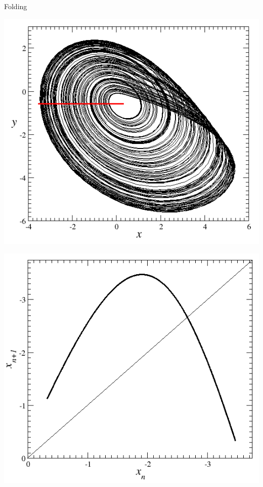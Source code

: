 \documentclass[usenames, dvipsnames, aspectratio=169]{beamer}
\begin{document}
\begin{frame}[t, c]{Folding}{}
  \vfill
  
  \begin{minipage}{.48\textwidth}
    \centering
    \includegraphics[width=\textwidth]{folding}
  \end{minipage}%
  \hfill
  \begin{minipage}{.48\textwidth}
    \centering
    \includegraphics[width=\textwidth]{folding_map}
  \end{minipage}

  \vfill
\end{frame}
\end{document}

